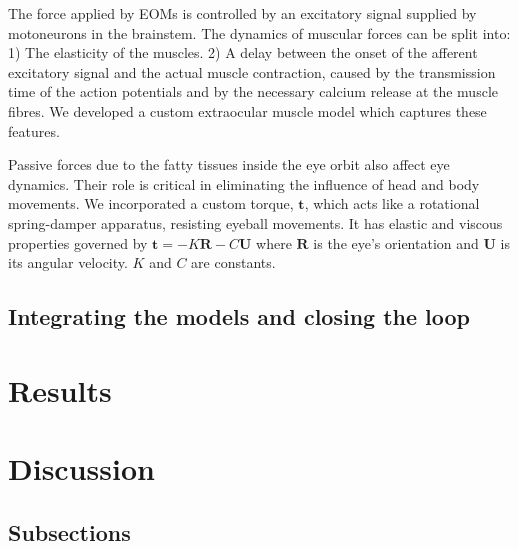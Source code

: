 \documentclass{frontiersSCNS}
\begin{document}
The force applied by EOMs is controlled by an excitatory signal
supplied by motoneurons in the brainstem. The dynamics of muscular
forces can be split into: 1) The elasticity of the muscles. 2) A delay
between the onset of the afferent excitatory signal and the actual
muscle contraction, caused by the transmission time of the action
potentials and by the necessary calcium release at the muscle
fibres. We developed a custom extraocular muscle model which captures
these features.

Passive forces due to the fatty tissues inside the eye orbit also
affect eye dynamics. Their role is critical in eliminating the
influence of head and body movements. We incorporated a custom torque, $\mathbf{t}$,
which acts like a rotational spring-damper apparatus, resisting
eyeball movements. It has elastic and viscous properties governed by
$\mathbf{t} = -K\mathbf{R}-C\mathbf{U}$ where $\mathbf{R}$ is the
eye's orientation and $\mathbf{U}$ is its angular velocity. $K$ and
$C$ are constants.

\subsection{Integrating the models and closing the loop}





\section{Results}

%

\section{Discussion}


\subsection{Subsections}
\end{document}
